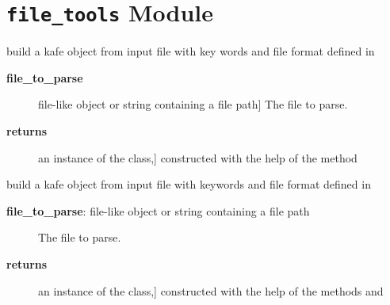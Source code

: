 \documentclass[a4paper,10pt,english]{sphinxmanual}
\begin{document}
\section{\texttt{file\_tools} Module}
\label{index:file-tools-module}\label{index:module-kafe.file_tools}\label{index:module-file_tools}

\begin{fulllineitems}
\label{index:kafe.file_tools.buildDataset_fromFile}
build a kafe  object from input file with key words
and file format defined in 
\begin{description}
\item[{\textbf{file\_to\_parse}}] \leavevmode{[}file-like object or string containing a file path{]}
The file to parse.

\item[{\textbf{returns}}] \leavevmode{[}an instance of the  class,{]}
constructed with the help of the method 

\end{description}

\end{fulllineitems}


\begin{fulllineitems}
\label{index:kafe.file_tools.buildFit_fromFile}
build a kafe  object from input file with keywords
and file format defined in 
\begin{description}
\item[{\textbf{file\_to\_parse}:  file-like object or string containing a file path}] \leavevmode
The file to parse.

\item[{\textbf{returns}}] \leavevmode{[}an instance of the  class,{]}
constructed with the help of the methods
 and

\end{description}

\end{fulllineitems}
\end{document}
